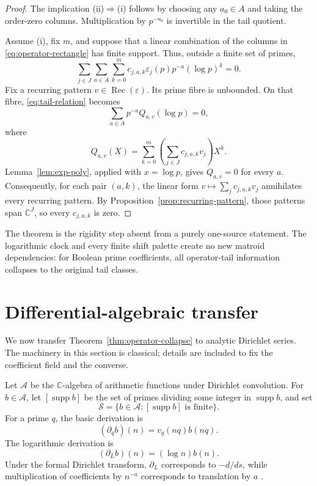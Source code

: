 \documentclass[11pt]{article}
\theoremstyle{definition}
\theoremstyle{remark}
\newcommand{\C}{\mathbb C}
\newcommand{\supp}{\operatorname{supp}}
\begin{document}
\begin{proof}
The implication (ii)\(\Rightarrow\)(i) follows by choosing any \(a_0\in A\) and taking
the order-zero columns.  Multiplication by \(p^{-a_0}\) is invertible in the tail quotient.

Assume (i), fix \(m\), and suppose that a linear combination of the columns in
\eqref{eq:operator-rectangle} has finite support.  Thus, outside a finite set of primes,
\begin{equation}\label{eq:tail-relation}
  \sum_{j\in J}\sum_{a\in A}\sum_{k=0}^m
    c_{j,a,k}\varepsilon_j(p)p^{-a}(\log p)^k=0.
\end{equation}
Fix a recurring pattern \(v\in\operatorname{Rec}(\varepsilon)\).  Its prime fibre is
unbounded.  On that fibre, \eqref{eq:tail-relation} becomes
\[
  \sum_{a\in A}p^{-a}Q_{a,v}(\log p)=0,
\]
where
\[
  Q_{a,v}(X)=\sum_{k=0}^m
     \left(\sum_{j\in J}c_{j,a,k}v_j\right)X^k.
\]
Lemma~\ref{lem:exp-poly}, applied with \(x=\log p\), gives \(Q_{a,v}=0\) for every
\(a\).  Consequently, for each pair \((a,k)\), the linear form
\(v\mapsto\sum_jc_{j,a,k}v_j\) annihilates every recurring pattern.  By
Proposition~\ref{prop:recurring-pattern}, those patterns span \(\C^J\), so every
\(c_{j,a,k}\) is zero.
\end{proof}

The theorem is the rigidity step absent from a purely one-source statement.  The logarithmic
clock and every finite shift palette create no new matroid dependencies: for Boolean prime
coefficients, all operator-tail information collapses to the original tail classes.

\section{Differential-algebraic transfer}\label{sec:transfer}

We now transfer Theorem~\ref{thm:operator-collapse} to analytic Dirichlet series.  The machinery
in this section is classical; details are included to fix the coefficient field and the converse.

Let \(\mathscr A\) be the \(\C\)-algebra of arithmetic functions under Dirichlet convolution.
For \(b\in\mathscr A\), let \([\supp b]\) be the set of primes dividing some integer in
\(\supp b\), and set
\[
  \mathscr S
  =\{b\in\mathscr A:[\supp b]\text{ is finite}\}.
\]
For a prime \(q\), the basic derivation is
\begin{equation}\label{eq:prime-deriv}
  (\partial_qb)(n)=v_q(nq)b(nq).
\end{equation}
The logarithmic derivation is
\begin{equation}\label{eq:log-deriv}
  (\partial_Lb)(n)=(\log n)b(n).
\end{equation}
Under the formal Dirichlet transform, \(\partial_L\) corresponds to \(-d/ds\), while
multiplication of coefficients by \(n^{-a}\) corresponds to translation by \(a\)
\cite{Pong2016}.
\end{document}
